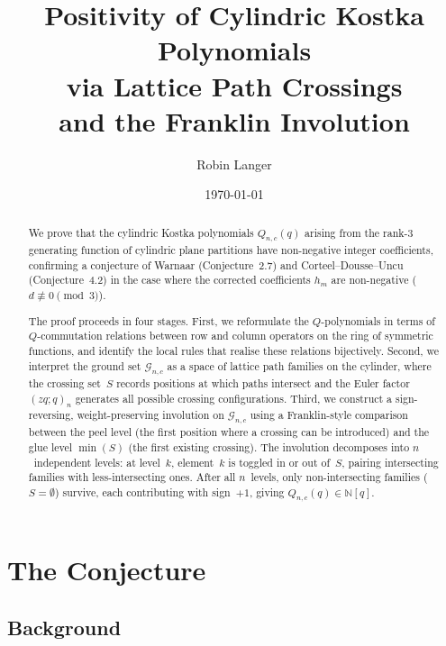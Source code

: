 \documentclass[11pt]{report}
\title{Positivity of Cylindric Kostka Polynomials\\
  via Lattice Path Crossings\\
  and the Franklin Involution}
\author{Robin Langer}
\date{\today}
\newcommand{\N}{\mathbb{N}}
\newcommand{\qpochn}[3]{(#1;#2)_{#3}}
\theoremstyle{plain}
\theoremstyle{definition}
\begin{document}
\maketitle

\begin{abstract}
We prove that the cylindric Kostka polynomials $Q_{n,c}(q)$
arising from the rank-$3$ generating function of cylindric
plane partitions have non-negative integer coefficients,
confirming a conjecture of Warnaar (Conjecture~2.7) and
Corteel--Dousse--Uncu (Conjecture~4.2) in the case where
the corrected coefficients $h_m$ are non-negative
($d \not\equiv 0 \pmod{3}$).

The proof proceeds in four stages.  First, we reformulate
the $Q$-polynomials in terms of $Q$-commutation relations
between row and column operators on the ring of symmetric
functions, and identify the local rules that realise these
relations bijectively.  Second, we interpret the ground set
$\mathcal{G}_{n,c}$ as a space of lattice path families on
the cylinder, where the crossing set~$S$ records positions
at which paths intersect and the Euler factor
$\qpochn{zq}{q}{n}$ generates all possible crossing
configurations.  Third, we construct a sign-reversing,
weight-preserving involution on $\mathcal{G}_{n,c}$ using
a Franklin-style comparison between the peel level (the
first position where a crossing can be introduced) and the
glue level $\min(S)$ (the first existing crossing).  The
involution decomposes into $n$~independent levels: at
level~$k$, element~$k$ is toggled in or out of~$S$,
pairing intersecting families with less-intersecting ones.
After all $n$~levels, only non-intersecting families
($S = \emptyset$) survive, each contributing with
sign~$+1$, giving $Q_{n,c}(q) \in \N[q]$.
\end{abstract}

\tableofcontents


\part{The Conjecture}
\label{part:conjecture}


\chapter{Background}
\label{ch:background}
\end{document}
